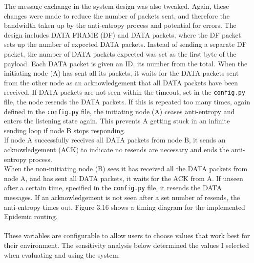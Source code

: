 \documentclass[12pt,a4paper]{report}
\begin{document}
The message exchange in the system design was also tweaked. Again, these changes were made to reduce the number of packets sent, and therefore the bandwidth taken up by the anti-entropy process and potential for errors. The design includes DATA FRAME (DF) and DATA packets, where the DF packet sets up the number of expected DATA packets. Instead of sending a separate DF packet, the number of DATA packets expected was set as the first byte of the payload. Each DATA packet is given an ID, its number from the total. When the initiating node (A) has sent all its packets, it waits for the DATA packets sent from the other node as an acknowledgement that all DATA packets have been received. If DATA packets are not seen within the timeout, set in the \verb'config.py' file, the node resends the DATA packets. If this is repeated too many times, again defined in the \verb'config.py' file, the initiating node (A) ceases anti-entropy and enters the listening state again. This prevents A getting stuck in an infinite sending loop if node B stops responding. \\ 
If node A successfully receives all DATA packets from node B, it sends an acknowledgement (ACK) to indicate no resends are necessary and ends the anti-entropy process. \\
When the non-initiating node (B) sees it has received all the DATA packets from node A, and has sent all DATA packets, it waits for the ACK from A. If unseen after a certain time, specified in the \verb'config.py' file, it resends the DATA messages. If an acknowledgement is not seen after a set number of resends, the anti-entropy times out. Figure 3.16 shows a timing diagram for the implemented Epidemic routing.  \\ \\
These variables are configurable to allow users to choose values that work best for their environment. The sensitivity analysis below determined the values I selected when evaluating and using the system.
\end{document}
